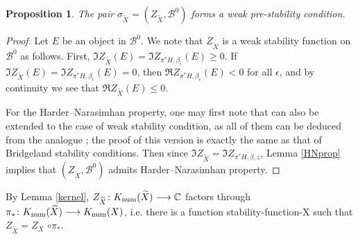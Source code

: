 \documentclass[12pt]{amsart}
\newtheorem{proposition}[theorem]{Proposition}
\theoremstyle{definition}
\DeclareMathOperator{\num}{num}
\begin{document}
\begin{proposition}\label{endpoint}
The pair $\sigma_{\widetilde{X}} =(Z_{\widetilde{X}},\mathcal{B}^0)$ forms a weak pre-stability condition.
\end{proposition}
\begin{proof}

Let $E$ be an object in $\mathcal{B}^0$.
We note that $Z_{\widetilde{X}}$ is a weak stability function on $\mathcal{B}^0$ as follows.
First, $\Im Z_{\widetilde{X}} (E)=\Im Z_{\pi^\ast H , \beta_\epsilon}(E) \geq 0$. 
If $\Im Z_{\widetilde{X}} (E)=\Im Z_{\pi^\ast H , \beta_\epsilon}(E) = 0$,
then  $\Re Z_{\pi^\ast H , \beta_\epsilon}(E)<0$ for all $\epsilon$,
and by continuity we see that $\Re Z_{\widetilde{X}}(E)\leq 0$.

For the Harder--Narasimhan property,  
one may first note that \cite[Prop. B.2]{BM11} can also be extended to the case of weak stability condition,
as all of them can be deduced from the analogue \cite[Prop. 2.4]{Bri07};
the proof of this version is exactly the same as that of Bridgeland stability conditions. 
Then since $\Im Z_{\widetilde{X}} = \Im Z_{\pi^\ast H,\beta,z}$,
Lemma \ref{HNprop} implies that $(Z_{\widetilde{X}},\mathcal{B}^0)$ admits Harder--Narasimhan property.
\end{proof}

By Lemma \ref{kernel}, $Z_{\widetilde{X}} \colon {\rm K}_{\num}(\widetilde{X}) \longrightarrow \mathbb{C}$ factors through $\pi_\ast \colon {\rm K}_{\num}(\widetilde{X}) \longrightarrow {\rm K}_{\num}(X)$, i.e. there is a function \gls{stability-function-X}  such that $Z_{\widetilde{X}} = Z_X$ $\circ \pi_\ast$. 
\end{document}
